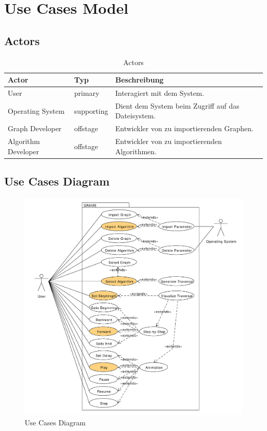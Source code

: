 \section{Use Cases Model}
\label{sec:Use Cases Model}
% 
\subsection{Actors}
\label{subsec:Actors}
\begin{table}[htp]
  \begin{tabular}[t]{|l|l|l|}\hline
	  \rowcolor{tcA}
	  Actor 		& Typ 		& Beschreibung \\\hline
	  User		 	& primary 	& Interagiert mit dem System. \\\hline
	  Operating System 	& supporting 	& Dient dem System beim Zugriff auf das Dateisystem. \\\hline
	  Graph Developer 	& offstage 	& Entwickler von zu importierenden Graphen. \\\hline
	  Algorithm Developer 	& offstage 	& Entwickler von zu importierenden Algorithmen. \\\hline
  \end{tabular}
  \caption{Actors}
  \label{tab:actors}
\end{table}
% 
\subsection{Use Cases Diagram}
\label{subsec:Use Cases Diagram}
\begin{figure}[H]
    \centering
    \includegraphics[scale=0.5]{diagrams/use-cases-diagram.pdf}
    \caption{Use Cases Diagram}
    \label{fig:use_cases_diagram}
\end{figure}
% 
